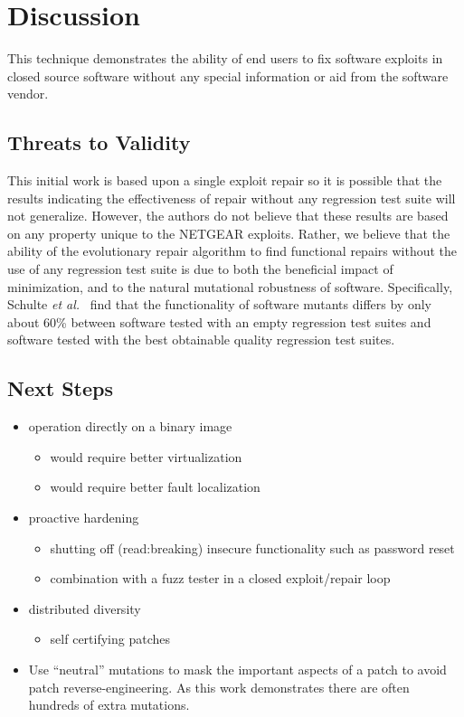 \documentclass{sigcomm-alternate}
\begin{document}
\section{Discussion}
\label{sec-6}
This technique demonstrates the ability of end users to fix software
exploits in closed source software without any special information or
aid from the software vendor.

\subsection{Threats to Validity}
\label{sec-6-1}
This initial work is based upon a single exploit repair so it is
possible that the results indicating the effectiveness of repair
without any regression test suite will not generalize.  However, the
authors do not believe that these results are based on any property
unique to the NETGEAR exploits. Rather, we believe that the ability of
the evolutionary repair algorithm to find functional repairs without
the use of any regression test suite is due to both the beneficial
impact of minimization, and to the natural mutational robustness of
software. Specifically, Schulte \emph{et al.}~\cite{schulte2013software} 
find that the functionality of software mutants differs by only about 60\%
between software tested with an empty regression test suites and software
tested with the best obtainable quality regression test suites.

\subsection{Next Steps}
\label{sec-6-2}

\begin{itemize}
\item operation directly on a binary image
\begin{itemize}
\item would require better virtualization
\item would require better fault localization
\end{itemize}
\item proactive hardening
\begin{itemize}
\item shutting off (read:breaking) insecure functionality such as
password reset
\item combination with a fuzz tester in a closed exploit/repair loop
\end{itemize}
\item distributed diversity
\begin{itemize}
\item self certifying patches
\end{itemize}
\item Use ``neutral'' mutations to mask the important aspects of a
  patch to avoid patch reverse-engineering.  As this work demonstrates
  there are often hundreds of extra mutations.
\end{itemize}
\end{document}

